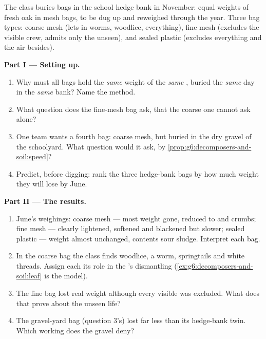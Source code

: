 \begin{problem}\label{pb:g6:decomposers-and-soil:1}
The class buries  bags in the school hedge bank in
November: equal weights of fresh oak  in mesh bags,
to be dug up and reweighed through the year. Three bag
types: coarse mesh (lets in worms, woodlice, everything),
fine mesh (excludes the visible crew, admits only the
unseen), and sealed plastic (excludes everything and the
air besides).

\medskip\noindent\textbf{Part I --- Setting up.}
\begin{enumerate}
  \item Why must all bags hold the \emph{same} weight of
        the \emph{same} , buried the \emph{same} day
        in the \emph{same} bank? Name the method.
  \item What question does the fine-mesh bag ask, that the
        coarse one cannot ask alone?
  \item One team wants a fourth bag: coarse mesh, but
        buried in the dry gravel of the schoolyard. What
        question would it ask, by
        \cref{prop:g6:decomposers-and-soil:speed}?
  \item Predict, before digging: rank the three hedge-bank
        bags by how much  weight they will lose by
        June.
\end{enumerate}

\medskip\noindent\textbf{Part II --- The results.}
\begin{enumerate}[resume]
  \item June's weighings: coarse mesh --- most weight gone,
         reduced to  and crumbs; fine mesh
        --- clearly lightened,  softened and
        blackened but slower; sealed plastic --- weight
        almost unchanged, contents sour sludge. Interpret
        each bag.
  \item In the coarse bag the class finds woodlice, a
        worm, springtails and white  threads. Assign
        each its role in the 's dismantling
        (\cref{ex:g6:decomposers-and-soil:leaf} is the
        model).
  \item The fine bag lost real weight although every
        visible  was excluded. What does that prove
        about the unseen  life?
  \item The gravel-yard bag (question 3's) lost far less
        than its hedge-bank twin. Which working 
        does the gravel deny?
\end{enumerate}


\end{problem}
